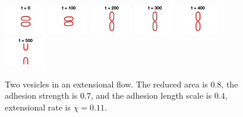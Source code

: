 \documentclass[aps,prl,twocolumn,showpacs,amsmath,amssymb]{revtex4-1}
\begin{document}
\begin{figure}[htp]
  \includegraphics[width = 0.16\textwidth]{figs/extensional_adR4em1adS7em1Chi1p1em1_ra080_image01.png}
  \includegraphics[width = 0.16\textwidth]{figs/extensional_adR4em1adS7em1Chi1p1em1_ra080_image02.png}
  \includegraphics[width = 0.16\textwidth]{figs/extensional_adR4em1adS7em1Chi1p1em1_ra080_image03.png}
  \includegraphics[width = 0.16\textwidth]{figs/extensional_adR4em1adS7em1Chi1p1em1_ra080_image04.png}
  \includegraphics[width = 0.16\textwidth]{figs/extensional_adR4em1adS7em1Chi1p1em1_ra080_image05.png}
  \includegraphics[width = 0.16\textwidth]{figs/extensional_adR4em1adS7em1Chi1p1em1_ra080_image06.png}
  \caption{Two vesicles in an extensional flow.  The reduced area is
  $0.8$, the adhesion strength is $0.7$, and the adhesion length scale
is $0.4$, extensional rate is $\chi = 0.11$.}
\end{figure}
\end{document}
